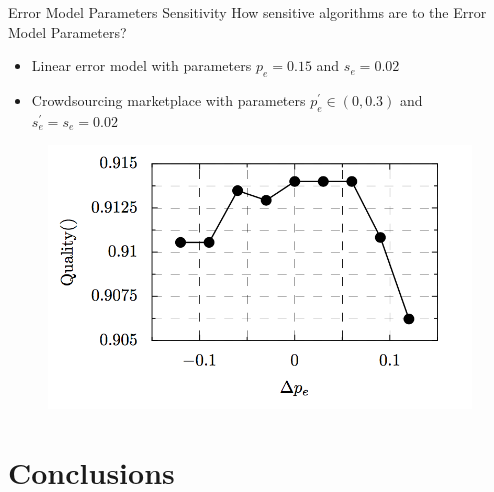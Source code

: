 \documentclass{beamer}
\begin{document}
\begin{frame}{Error Model Parameters Sensitivity}
	How sensitive algorithms are to the Error Model Parameters?
	\begin{itemize}
		\item Linear error model with parameters $p_e = 0.15$ and $s_e = 0.02$
		\item Crowdsourcing marketplace with parameters $p_e^{'} \in (0, 0.3)$ and $s_e^{'} = s_e = 0.02$
	\end{itemize}
	\begin{figure}
		\center
		\includegraphics[scale=0.4]{images/sensitivity.png}
		\end{figure}
\end{frame}

\section{Conclusions}
\begin{frame}
\end{frame}
\end{document}
